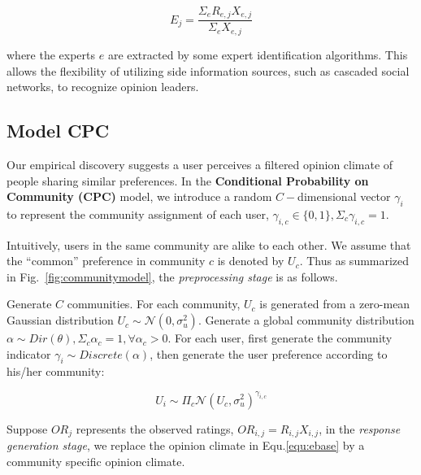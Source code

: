 \documentclass[sigconf]{acmart}
\begin{document}
\begin{equation}\label{eexpert}
E_j = \frac{\Sigma_e R_{e,j}X_{e,j}}{\Sigma_e X_{e,j}}
\end{equation}

where the experts $e$ are extracted by some expert identification algorithms. This allows the flexibility of utilizing side information sources, such as cascaded social networks, to recognize opinion leaders. 

\subsection{Model CPC}
Our empirical discovery suggests a user perceives a filtered opinion climate of people sharing similar preferences. In the \textbf{Conditional Probability on Community (CPC)} model, we introduce a random $C-$dimensional vector $\gamma_i$ to represent the community assignment of each user,  $\gamma_{i,c}\in \{0,1\}, \Sigma_c \gamma_{i,c}=1$.  


Intuitively, users in the same community are alike to each other. We assume that the ``common'' preference in community $c$ is denoted by $U_c$. Thus as summarized in Fig.~\ref{fig:communitymodel}, the \textit{preprocessing stage} is as follows.

Generate $C$ communities. For each community, $U_c$ is generated from a zero-mean Gaussian distribution $U_c \sim \mathcal{N}(0,\sigma_u^2)$. Generate a global community distribution $\alpha\sim Dir(\theta), \Sigma_c \alpha_c=1, \forall \alpha_c>0$. For each user, first generate the community indicator $\gamma_i \sim Discrete(\alpha)$, then generate the user preference according to his/her community:

\begin{equation}\label{equ:preferencebase}
U_i \sim \Pi_c \mathcal{N}(U_c,\sigma_u^2)^{\gamma_{i,c}}
\end{equation}

Suppose $OR_j$ represents the observed ratings, $OR_{i,j}=R_{i,j}X_{i,j}$, in the \textit{response generation stage}, we replace the opinion climate in Equ.\ref{equ:ebase} by a community specific opinion climate.  
\end{document}
